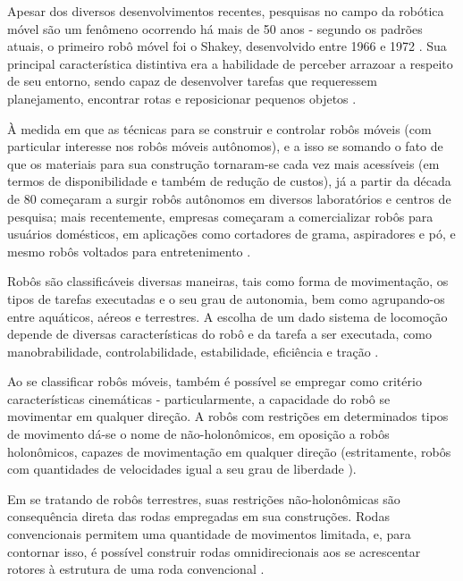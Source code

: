 

Apesar dos diversos desenvolvimentos recentes, pesquisas no campo da robótica móvel são um fenômeno ocorrendo há mais de 50 anos - segundo os padrões atuais, 
o primeiro robô móvel foi o Shakey, desenvolvido entre 1966 e 1972 \cite{TAKAHASHI}. 
Sua principal característica distintiva era a habilidade de perceber arrazoar a respeito de seu entorno, 
sendo capaz de desenvolver tarefas que requeressem planejamento, encontrar rotas e reposicionar pequenos objetos \cite{sri_international}.

À medida em que as técnicas para se construir e controlar robôs móveis (com particular interesse nos robôs móveis autônomos), 
e a isso se somando o fato de que os materiais para sua construção tornaram-se cada vez mais acessíveis (em termos de disponibilidade 
e também de redução de custos), já a partir da década de 80 começaram a surgir robôs autônomos em diversos laboratórios e centros de pesquisa;
 mais recentemente, empresas começaram a comercializar robôs para usuários domésticos, em aplicações como cortadores de grama, aspiradores e pó, 
 e mesmo robôs voltados para entretenimento \cite{TAKAHASHI}.

Robôs são classificáveis diversas maneiras, tais como forma de movimentação, os tipos de tarefas executadas e o seu grau de autonomia, 
bem como agrupando-os entre aquáticos, aéreos e terrestres. A escolha de um dado sistema de locomoção depende de diversas características do robô e 
da tarefa a ser executada, como manobrabilidade, controlabilidade, estabilidade, eficiência e tração \cite{TAKAHASHI}.

Ao se classificar robôs móveis, também é possível se empregar como critério características cinemáticas - particularmente, 
a capacidade do robô se movimentar em qualquer direção. A robôs com restrições em determinados tipos de movimento dá-se o nome de não-holonômicos, 
em oposição a robôs holonômicos, capazes de movimentação em qualquer direção (estritamente, robôs com quantidades de velocidades igual a seu grau de liberdade \cite{TAKAHASHI}).

Em se tratando de robôs terrestres, suas restrições não-holonômicas são consequência direta das rodas empregadas em sua construções. 
Rodas convencionais permitem uma quantidade de movimentos limitada, e, para contornar isso, é possível construir rodas omnidirecionais aos se acrescentar rotores à estrutura de uma roda convencional \cite{TAKAHASHI}.
